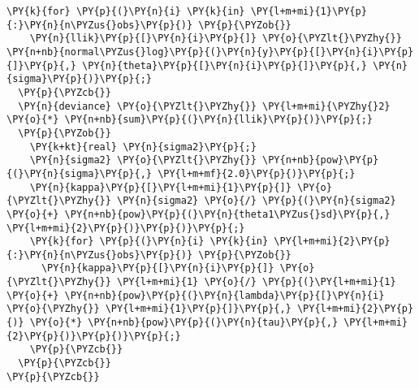 \begin{Verbatim}[commandchars=\\\{\}]
  \PY{k}{for} \PY{p}{(}\PY{n}{i} \PY{k}{in} \PY{l+m+mi}{1}\PY{p}{:}\PY{n}{n\PYZus{}obs}\PY{p}{)} \PY{p}{\PYZob{}}
    \PY{n}{llik}\PY{p}{[}\PY{n}{i}\PY{p}{]} \PY{o}{\PYZlt{}\PYZhy{}} \PY{n+nb}{normal\PYZus{}log}\PY{p}{(}\PY{n}{y}\PY{p}{[}\PY{n}{i}\PY{p}{]}\PY{p}{,} \PY{n}{theta}\PY{p}{[}\PY{n}{i}\PY{p}{]}\PY{p}{,} \PY{n}{sigma}\PY{p}{)}\PY{p}{;}
  \PY{p}{\PYZcb{}}
  \PY{n}{deviance} \PY{o}{\PYZlt{}\PYZhy{}} \PY{l+m+mi}{\PYZhy{}2} \PY{o}{*} \PY{n+nb}{sum}\PY{p}{(}\PY{n}{llik}\PY{p}{)}\PY{p}{;}
  \PY{p}{\PYZob{}}
    \PY{k+kt}{real} \PY{n}{sigma2}\PY{p}{;}
    \PY{n}{sigma2} \PY{o}{\PYZlt{}\PYZhy{}} \PY{n+nb}{pow}\PY{p}{(}\PY{n}{sigma}\PY{p}{,} \PY{l+m+mf}{2.0}\PY{p}{)}\PY{p}{;}
    \PY{n}{kappa}\PY{p}{[}\PY{l+m+mi}{1}\PY{p}{]} \PY{o}{\PYZlt{}\PYZhy{}} \PY{n}{sigma2} \PY{o}{/} \PY{p}{(}\PY{n}{sigma2} \PY{o}{+} \PY{n+nb}{pow}\PY{p}{(}\PY{n}{theta1\PYZus{}sd}\PY{p}{,} \PY{l+m+mi}{2}\PY{p}{)}\PY{p}{)}\PY{p}{;}
    \PY{k}{for} \PY{p}{(}\PY{n}{i} \PY{k}{in} \PY{l+m+mi}{2}\PY{p}{:}\PY{n}{n\PYZus{}obs}\PY{p}{)} \PY{p}{\PYZob{}}
      \PY{n}{kappa}\PY{p}{[}\PY{n}{i}\PY{p}{]} \PY{o}{\PYZlt{}\PYZhy{}} \PY{l+m+mi}{1} \PY{o}{/} \PY{p}{(}\PY{l+m+mi}{1} \PY{o}{+} \PY{n+nb}{pow}\PY{p}{(}\PY{n}{lambda}\PY{p}{[}\PY{n}{i} \PY{o}{\PYZhy{}} \PY{l+m+mi}{1}\PY{p}{]}\PY{p}{,} \PY{l+m+mi}{2}\PY{p}{)} \PY{o}{*} \PY{n+nb}{pow}\PY{p}{(}\PY{n}{tau}\PY{p}{,} \PY{l+m+mi}{2}\PY{p}{)}\PY{p}{)}\PY{p}{;}
    \PY{p}{\PYZcb{}}
  \PY{p}{\PYZcb{}}
\PY{p}{\PYZcb{}}
\end{Verbatim}
